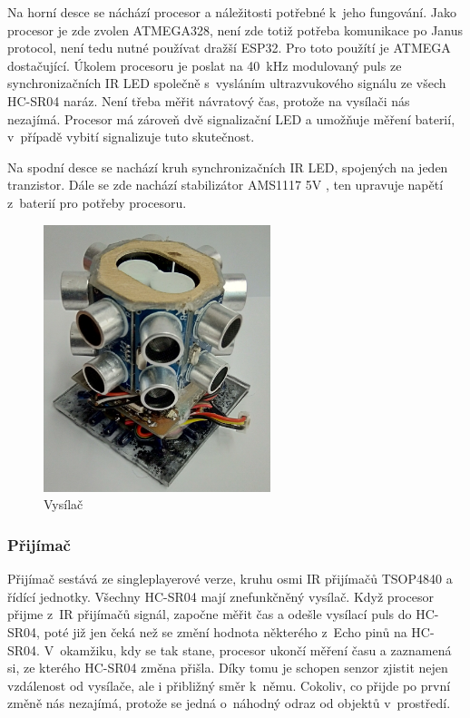 Na horní desce se náchází procesor a náležitosti potřebné k~jeho fungování.
Jako procesor je zde zvolen ATMEGA328\cite{atmega}, není zde totiž potřeba komunikace po Janus protocol, není tedu nutné používat dražší ESP32.
Pro toto použítí je ATMEGA dostačující.
Úkolem procesoru je poslat na 40~kHz modulovaný puls ze synchronizačních IR LED společně s~vysláním ultrazvukového signálu ze všech HC-SR04 naráz. 
Není třeba měřit návratový čas, protože na vysílači nás nezajímá.
Procesor má zároveň dvě signalizační LED a umožňuje měření baterií, v~případě vybití signalizuje tuto skutečnost.

Na spodní desce se nachází kruh synchronizačních IR LED, spojených na jeden tranzistor.
Dále se zde nachází stabilizátor AMS1117 5V \cite{ams1117}, ten upravuje napětí z~baterií pro potřeby procesoru.

\begin{figure}
    \begin{small}
        \begin{center}
            \includegraphics[width=250px, angle = 0, scale = 0.7]{img/Vysilac2.jpg}
        \end{center}
        \caption{Vysílač}
        \label{fig: Ultrasonic}
    \end{small}
\end{figure}


\subsubsection{Přijímač}
Přijímač sestává ze singleplayerové verze, kruhu osmi IR přijímačů TSOP4840 a řídící jednotky.
Všechny HC-SR04 mají znefunkčněný vysílač.
Když procesor přijme z~IR přijímačů signál, započne měřit čas a odešle vysílací puls do HC-SR04, poté již jen čeká než se změní hodnota některého z~Echo pinů na HC-SR04.
V~okamžiku, kdy se tak stane, procesor ukončí měření času a zaznamená si, ze kterého HC-SR04 změna přišla.
Díky tomu je schopen senzor zjistit nejen vzdálenost od vysílače, ale i přibližný směr k~němu.
Cokoliv, co přijde po první změně nás nezajímá, protože se jedná o~náhodný odraz od objektů v~prostředí.

